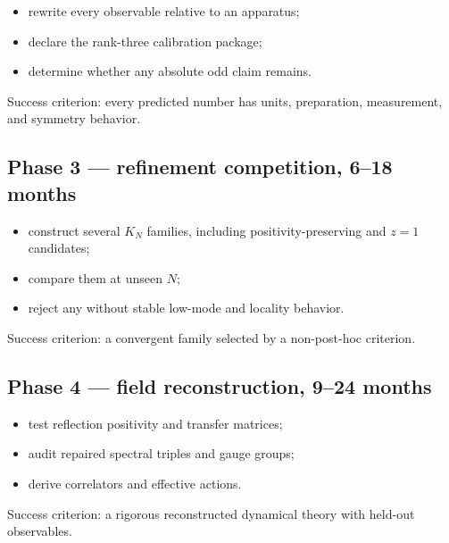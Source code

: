 \documentclass[11pt,a4paper,openany]{report}
\begin{document}
\begin{itemize}
\item 
rewrite every observable relative to an apparatus;

\item 
declare the rank-three calibration package;

\item 
determine whether any absolute odd claim remains.

\end{itemize}

Success criterion: every predicted number has units, preparation, measurement, and symmetry behavior.

\subsection{Phase 3 — refinement competition, 6–18 months}

\begin{itemize}
\item 
construct several \(K_N\) families, including positivity-preserving and \(z=1\) candidates;

\item 
compare them at unseen \(N\);

\item 
reject any without stable low-mode and locality behavior.

\end{itemize}

Success criterion: a convergent family selected by a non-post-hoc criterion.

\subsection{Phase 4 — field reconstruction, 9–24 months}

\begin{itemize}
\item 
test reflection positivity and transfer matrices;

\item 
audit repaired spectral triples and gauge groups;

\item 
derive correlators and effective actions.

\end{itemize}

Success criterion: a rigorous reconstructed dynamical theory with held-out observables.
\end{document}

